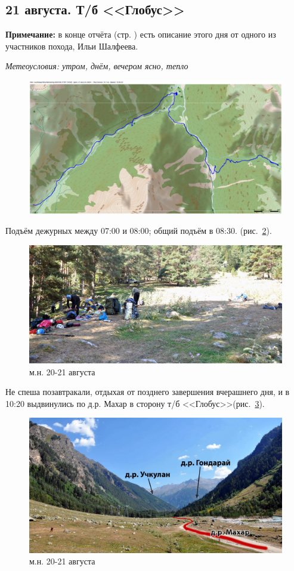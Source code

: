 \subsection{21 августа. Т/б <<Глобус>>}
\textbf{Примечание:} в конце отчёта (стр. \pageref{ilya}) есть описание этого дня от одного из участников похода, Ильи Шалфеева.

\textit{Метеоусловия: утром, днём, вечером ясно, тепло}

\begin{figure}[h!]
	\centering
	\includegraphics[angle=0, width=0.7\linewidth]{../pics/mini_maps/21}
	\label{fig:mini_21}
\end{figure}

Подъём дежурных между 07:00 и 08:00; общий подъём в 08:30. (рис.~\ref{fig:DSC_0993}). 

\begin{figure}[h]
	\centering
	\includegraphics[width=0.7\linewidth]{../pics/DSC_0993}
	\caption{м.н. 20-21 августа}
	\label{fig:DSC_0993}
\end{figure}

Не спеша позавтракали, отдыхая от позднего завершения вчерашнего дня, и в 10:20 выдвинулись по д.р. Махар в сторону т/б <<Глобус>>(рис.~\ref{fig:DSC_1003}). 

\begin{figure}[h]
	\centering
	\includegraphics[width=0.7\linewidth]{../pics/DSC_1003}
	\caption{м.н. 20-21 августа}
	\label{fig:DSC_1003}
\end{figure}

